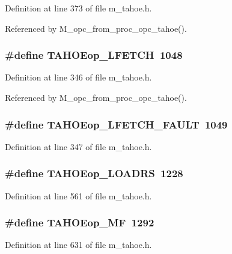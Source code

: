 Definition at line 373 of file m\_\-tahoe.h.

Referenced by M\_\-opc\_\-from\_\-proc\_\-opc\_\-tahoe().
\subsubsection{\setlength{\rightskip}{0pt plus 5cm}\#define TAHOEop\_\-LFETCH~1048}\label{m__tahoe_8h_a2f3e21ff135588ac2e0ca90d9c889fa}




Definition at line 346 of file m\_\-tahoe.h.

Referenced by M\_\-opc\_\-from\_\-proc\_\-opc\_\-tahoe().
\subsubsection{\setlength{\rightskip}{0pt plus 5cm}\#define TAHOEop\_\-LFETCH\_\-FAULT~1049}\label{m__tahoe_8h_b9d4e1a7981079b3b121541fbb14cc26}




Definition at line 347 of file m\_\-tahoe.h.
\subsubsection{\setlength{\rightskip}{0pt plus 5cm}\#define TAHOEop\_\-LOADRS~1228}\label{m__tahoe_8h_ff7c5f4da2dc22dbbf17f558565adf92}




Definition at line 561 of file m\_\-tahoe.h.
\subsubsection{\setlength{\rightskip}{0pt plus 5cm}\#define TAHOEop\_\-MF~1292}\label{m__tahoe_8h_1dc4986f533627746bc8d104a8b7fe57}




Definition at line 631 of file m\_\-tahoe.h.
